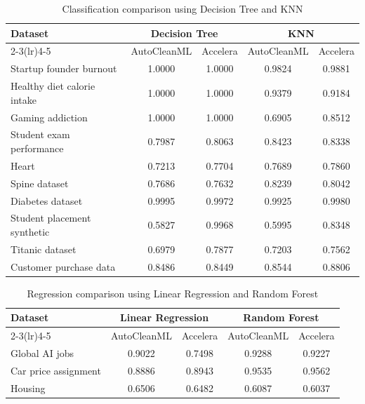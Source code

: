 \documentclass[12pt,a4paper]{report}
\newcommand{\acceleraTableStyle}{%
\small
\renewcommand{\arraystretch}{1.15}
\setlength{\tabcolsep}{4pt}%
}
\begin{document}
\begin{table}[H]
\centering
\acceleraTableStyle
\caption{Classification comparison using Decision Tree and KNN}
\label{tab:classification-dt-knn-autoclean-accelera}
\begin{tabular}{p{}cccc}
\toprule
Dataset & \multicolumn{2}{c}{Decision Tree} & \multicolumn{2}{c}{KNN} \\
\cmidrule(lr){2-3}\cmidrule(lr){4-5}
 & AutoCleanML & Accelera & AutoCleanML & Accelera \\
\midrule
Startup founder burnout & 1.0000 & 1.0000 & 0.9824 & 0.9881 \\
Healthy diet calorie intake & 1.0000 & 1.0000 & 0.9379 & 0.9184 \\
Gaming addiction & 1.0000 & 1.0000 & 0.6905 & 0.8512 \\
Student exam performance & 0.7987 & 0.8063 & 0.8423 & 0.8338 \\
Heart & 0.7213 & 0.7704 & 0.7689 & 0.7860 \\
Spine dataset & 0.7686 & 0.7632 & 0.8239 & 0.8042 \\
Diabetes dataset & 0.9995 & 0.9972 & 0.9925 & 0.9980 \\
Student placement synthetic & 0.5827 & 0.9968 & 0.5995 & 0.8348 \\
Titanic dataset & 0.6979 & 0.7877 & 0.7203 & 0.7562 \\
Customer purchase data & 0.8486 & 0.8449 & 0.8544 & 0.8806 \\
\bottomrule
\end{tabular}
\end{table}

\begin{table}[H]
\centering
\acceleraTableStyle
\caption{Regression comparison using Linear Regression and Random Forest}
\label{tab:regression-lr-rf-autoclean-accelera}
\begin{tabular}{p{}cccc}
\toprule
Dataset & \multicolumn{2}{c}{Linear Regression} & \multicolumn{2}{c}{Random Forest} \\
\cmidrule(lr){2-3}\cmidrule(lr){4-5}
 & AutoCleanML & Accelera & AutoCleanML & Accelera \\
\midrule
Global AI jobs & 0.9022 & 0.7498 & 0.9288 & 0.9227 \\
Car price assignment & 0.8886 & 0.8943 & 0.9535 & 0.9562 \\
Housing & 0.6506 & 0.6482 & 0.6087 & 0.6037 \\
\bottomrule
\end{tabular}
\end{table}
\end{document}
